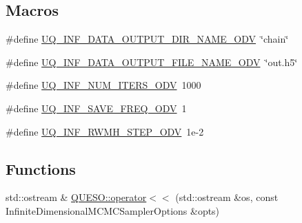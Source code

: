 \subsection*{Macros}
\begin{DoxyCompactItemize}
\item 
\#define \hyperlink{_infinite_dimensional_m_c_m_c_sampler_options_8_c_aec1cc3af00e966ad1f72d4991db506f9}{U\-Q\-\_\-\-I\-N\-F\-\_\-\-D\-A\-T\-A\-\_\-\-O\-U\-T\-P\-U\-T\-\_\-\-D\-I\-R\-\_\-\-N\-A\-M\-E\-\_\-\-O\-D\-V}~\char`\"{}chain\char`\"{}
\item 
\#define \hyperlink{_infinite_dimensional_m_c_m_c_sampler_options_8_c_a94a16132b1d2694fe1ba4602594e7bc7}{U\-Q\-\_\-\-I\-N\-F\-\_\-\-D\-A\-T\-A\-\_\-\-O\-U\-T\-P\-U\-T\-\_\-\-F\-I\-L\-E\-\_\-\-N\-A\-M\-E\-\_\-\-O\-D\-V}~\char`\"{}out.\-h5\char`\"{}
\item 
\#define \hyperlink{_infinite_dimensional_m_c_m_c_sampler_options_8_c_a09baf502e91d02389a48a0eb808826f3}{U\-Q\-\_\-\-I\-N\-F\-\_\-\-N\-U\-M\-\_\-\-I\-T\-E\-R\-S\-\_\-\-O\-D\-V}~1000
\item 
\#define \hyperlink{_infinite_dimensional_m_c_m_c_sampler_options_8_c_ab6e147540aa260f27861a36a39443878}{U\-Q\-\_\-\-I\-N\-F\-\_\-\-S\-A\-V\-E\-\_\-\-F\-R\-E\-Q\-\_\-\-O\-D\-V}~1
\item 
\#define \hyperlink{_infinite_dimensional_m_c_m_c_sampler_options_8_c_ab6dfe19abe6e2708a3bb7e50c07ee8da}{U\-Q\-\_\-\-I\-N\-F\-\_\-\-R\-W\-M\-H\-\_\-\-S\-T\-E\-P\-\_\-\-O\-D\-V}~1e-\/2
\end{DoxyCompactItemize}
\subsection*{Functions}
\begin{DoxyCompactItemize}
\item 
std\-::ostream \& \hyperlink{namespace_q_u_e_s_o_a30313c4aa1faccd51c175757a7f4eb61}{Q\-U\-E\-S\-O\-::operator$<$$<$} (std\-::ostream \&os, const Infinite\-Dimensional\-M\-C\-M\-C\-Sampler\-Options \&opts)
\end{DoxyCompactItemize}


